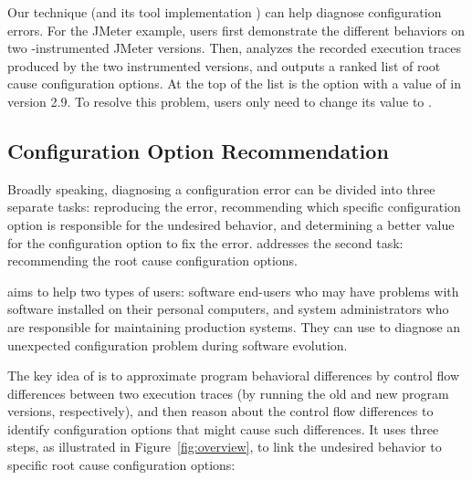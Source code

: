 
Our technique (and its tool implementation \ourtool) can help
diagnose configuration errors. For the JMeter example,
users first demonstrate the different
behaviors on two \ourtool-instrumented
JMeter versions. Then, \ourtool analyzes the
recorded execution traces produced by the two instrumented
versions, and outputs a ranked list of root cause configuration options.
At the top of the list is the
 option with a value of 
in version 2.9.
To resolve this problem, users only need to change
its value to .

\subsection{Configuration Option Recommendation}

Broadly speaking, diagnosing a configuration
error can be divided into three separate tasks:
reproducing the error, recommending which specific
configuration option is responsible for the undesired
behavior, and determining a better value for the
configuration option to fix the error. \ourtool addresses
the second task: recommending the root cause configuration options.

\ourtool aims to help two types of users: software end-users
who may have problems with software installed on their
personal computers, and system administrators who are
responsible for maintaining production systems.
They can use \ourtool to diagnose an unexpected configuration
problem during software evolution. 


The key idea of \ourtool is to approximate program behavioral
differences by control flow differences between 
two execution traces (by running the old
and new program versions, respectively),
and then reason about the control flow differences to
identify configuration options that
might cause such differences. It uses
three steps, as illustrated in Figure~\ref{fig:overview},  to link the undesired
behavior to specific root cause configuration options:

